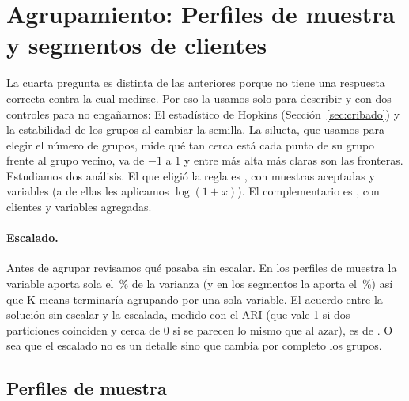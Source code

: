\section{Agrupamiento: Perfiles de muestra y segmentos de clientes}
\label{sec:agrupamiento}

La cuarta pregunta es distinta de las anteriores porque no tiene una
respuesta correcta contra la cual medirse. Por eso la usamos solo para
describir y con dos controles para no engañarnos: El estadístico de Hopkins
(Sección~\ref{sec:cribado}) y la estabilidad de los grupos al cambiar la
semilla. La
silueta, que usamos para elegir el número de grupos, mide qué tan cerca está
cada punto de su grupo frente al grupo vecino, va de $-1$ a 1 y entre más
alta más claras son las fronteras. Estudiamos dos análisis. El que eligió la
regla es \codigo{\AgrSeleccionado}, con \AgrSelFilas{} muestras aceptadas y
\AgrSelVariables{} variables (a \AgrSelConLog{} de ellas les aplicamos
$\log(1+x)$). El complementario es \codigo{\AgrComplementario}, con
\AgrCompFilas{} clientes y \AgrCompVariables{} variables agregadas.

\paragraph{Escalado.} Antes de agrupar revisamos qué pasaba sin escalar. En
los perfiles de muestra la variable \AgrSelDominante{} aporta sola el
\AgrSelDominantePct{}\,\% de la varianza (y en los segmentos la
\AgrCompDominante{} aporta el \AgrCompDominantePct{}\,\%) así que K-means
terminaría agrupando por una sola variable. El acuerdo entre la solución sin
escalar y la escalada, medido con el ARI (que vale 1 si dos particiones
coinciden y cerca de 0 si se parecen lo mismo que al azar), es de
\AgrSelARISinEscalar{}. O sea que el escalado no es un detalle sino que
cambia por completo los grupos.

\subsection{Perfiles de muestra}

